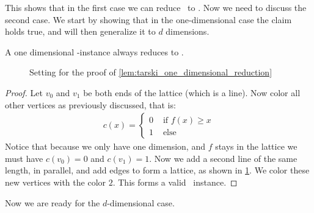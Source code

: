 This shows that in the first case we can reduce \Tarskistar\ to \Sperner. Now we need to discuss the second case. We start by showing that in the one-dimensional case the claim holds true, and will then generalize it to $d$ dimensions.

\begin{lemma}\label{lem:tarski_one_dimensional_reduction}
	A one dimensional \Tarskistar-instance always reduces to \Sperner\@.
\end{lemma}

\begin{figure}
	\centering
	\caption[Reduction of one-dimensional \Tarskistar\ to \Sperner]{Setting for the proof of \cref{lem:tarski_one_dimensional_reduction}}\label{fig:tarski_one_dimensional_reduction}
\end{figure}

\begin{proof}
	Let $v_0$ and $v_1$ be both ends of the lattice (which is a line). Now color all other vertices as previously discussed, that is:
	\begin{align*}
		c(x) =  \begin{cases}
			        0 & \text{ if $f(x) \geq x$} \\
			        1 & \text{ else}
		        \end{cases}
	\end{align*}
	Notice that because we only have one dimension, and $f$ stays in the lattice we must have $c(v_0) = 0$ and $c(v_1) = 1$. Now we add a second line of the same length, in parallel, and add edges to form a lattice, as shown in \cref{fig:tarski_one_dimensional_reduction}. We color these new vertices with the color $2$. This forms a valid \Sperner\ instance.
\end{proof}

Now we are ready for the $d$-dimensional case.

